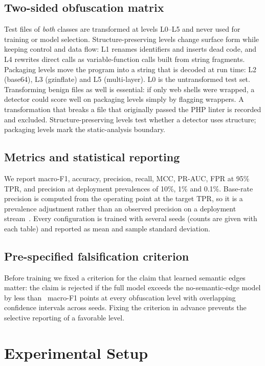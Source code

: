 \documentclass[pdflatex,sn-mathphys-num]{sn-jnl}
\begin{document}
\subsection{Two-sided obfuscation matrix}\label{sec:p-obf}
Test files of \emph{both} classes are transformed at levels L0--L5 and never
used for training or model selection. Structure-preserving levels change
surface form while keeping control and data flow: L1 renames identifiers and
inserts dead code, and L4 rewrites direct calls as variable-function calls
built from string fragments. Packaging levels move the program into a string
that is decoded at run time: L2 (base64), L3 (gzinflate) and L5 (multi-layer).
L0 is the untransformed test set. Transforming benign files as well is
essential: if only web shells were wrapped, a detector could score well on
packaging levels simply by flagging wrappers. A transformation that breaks a
file that originally passed the PHP linter is recorded and excluded.
Structure-preserving levels test whether a detector uses structure; packaging
levels mark the static-analysis boundary.

\subsection{Metrics and statistical reporting}\label{sec:p-metrics}
We report macro-F1, accuracy, precision, recall, MCC, PR-AUC, FPR at 95\% TPR,
and precision at deployment prevalences of 10\%, 1\% and 0.1\%. Base-rate
precision is computed from the operating point at the target TPR, so it is a
prevalence adjustment rather than an observed precision on a deployment
stream~\cite{axelsson2000base}. Every configuration is trained with several
seeds (counts are given with each table) and reported as mean and sample
standard deviation.

\subsection{Pre-specified falsification criterion}\label{sec:p-c11}
Before training we fixed a criterion for the claim that learned semantic edges
matter: the claim is rejected if the full model exceeds the no-semantic-edge
model by less than \CElevenMargin\ macro-F1 points at every obfuscation level
with overlapping confidence intervals across seeds. Fixing the criterion in
advance prevents the selective reporting of a favorable level.

\section{Experimental Setup}\label{sec:setup}
\end{document}
